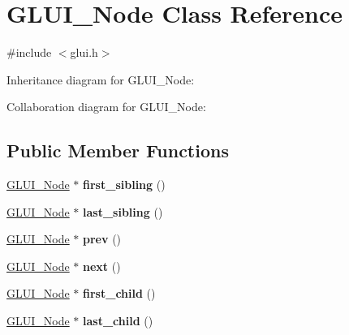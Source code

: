 \hypertarget{class_g_l_u_i___node}{\section{G\+L\+U\+I\+\_\+\+Node Class Reference}
\label{class_g_l_u_i___node}
}


{\ttfamily \#include $<$glui.\+h$>$}



Inheritance diagram for G\+L\+U\+I\+\_\+\+Node\+:


Collaboration diagram for G\+L\+U\+I\+\_\+\+Node\+:
\subsection*{Public Member Functions}
\begin{DoxyCompactItemize}
\item 
\hypertarget{class_g_l_u_i___node_ad5b0767f3f65a74b8401f531d6850ea8}{\hyperlink{class_g_l_u_i___node}{G\+L\+U\+I\+\_\+\+Node} $\ast$ {\bfseries first\+\_\+sibling} ()}\label{class_g_l_u_i___node_ad5b0767f3f65a74b8401f531d6850ea8}

\item 
\hypertarget{class_g_l_u_i___node_abc79bf831b2789f9c3e8231e6b1afc9f}{\hyperlink{class_g_l_u_i___node}{G\+L\+U\+I\+\_\+\+Node} $\ast$ {\bfseries last\+\_\+sibling} ()}\label{class_g_l_u_i___node_abc79bf831b2789f9c3e8231e6b1afc9f}

\item 
\hypertarget{class_g_l_u_i___node_a342a7d46592ce4d9dd9572fae09ead22}{\hyperlink{class_g_l_u_i___node}{G\+L\+U\+I\+\_\+\+Node} $\ast$ {\bfseries prev} ()}\label{class_g_l_u_i___node_a342a7d46592ce4d9dd9572fae09ead22}

\item 
\hypertarget{class_g_l_u_i___node_a9752733c92840813b27147ab87d77a69}{\hyperlink{class_g_l_u_i___node}{G\+L\+U\+I\+\_\+\+Node} $\ast$ {\bfseries next} ()}\label{class_g_l_u_i___node_a9752733c92840813b27147ab87d77a69}

\item 
\hypertarget{class_g_l_u_i___node_a631b094804b887c0d091ece2786543d1}{\hyperlink{class_g_l_u_i___node}{G\+L\+U\+I\+\_\+\+Node} $\ast$ {\bfseries first\+\_\+child} ()}\label{class_g_l_u_i___node_a631b094804b887c0d091ece2786543d1}

\item 
\hypertarget{class_g_l_u_i___node_a4825cdc843f0e2b46d75fe5cb9e8ba35}{\hyperlink{class_g_l_u_i___node}{G\+L\+U\+I\+\_\+\+Node} $\ast$ {\bfseries last\+\_\+child} ()}\label{class_g_l_u_i___node_a4825cdc843f0e2b46d75fe5cb9e8ba35}


\end{DoxyCompactItemize}
